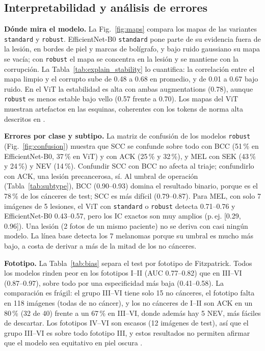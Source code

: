 \documentclass[conference]{IEEEtran}
\begin{document}
\subsection{Interpretabilidad y análisis de errores}
\textbf{Dónde mira el modelo.} La Fig.~\ref{fig:maps} compara los mapas de las variantes \texttt{standard} y \texttt{robust}. EfficientNet-B0 \texttt{standard} pone parte de su evidencia fuera de la lesión, en bordes de piel y marcas de bolígrafo, y bajo ruido gaussiano su mapa se vacía; con \texttt{robust} el mapa se concentra en la lesión y se mantiene con la corrupción. La Tabla~\ref{tab:explain_stability} lo cuantifica: la correlación entre el mapa limpio y el corrupto sube de 0.48 a 0.68 en promedio, y de 0.01 a 0.67 bajo ruido. En el ViT la estabilidad es alta con ambas augmentations (0.78), aunque \texttt{robust} es menos estable bajo vello (0.57 frente a 0.70). Los mapas del ViT muestran artefactos en las esquinas, coherentes con los tokens de norma alta descritos en \cite{darcet2024}.

\textbf{Errores por clase y subtipo.} La matriz de confusión de los modelos \texttt{robust} (Fig.~\ref{fig:confusion}) muestra que SCC se confunde sobre todo con BCC (51\,\% en EfficientNet-B0, 37\,\% en ViT) y con ACK (25\,\% y 32\,\%), y MEL con SEK (43\,\% y 24\,\%) y NEV (14\,\%). Confundir SCC con BCC no afecta al triaje; confundirlo con ACK, una lesión precancerosa, sí. Al umbral de operación (Tabla~\ref{tab:subtype}), BCC (0.90--0.93) domina el resultado binario, porque es el 78\,\% de los cánceres de test; SCC es más difícil (0.79--0.87). Para MEL, con solo 7 imágenes de 5 lesiones, el ViT con \texttt{standard} o \texttt{robust} detecta 0.71--0.76 y EfficientNet-B0 0.43--0.57, pero los IC exactos son muy amplios (p.\,ej. [0.29, 0.96]). Una lesión (2 fotos de un mismo paciente) no se deriva con casi ningún modelo. La línea base detecta los 7 melanomas porque su umbral es mucho más bajo, a costa de derivar a más de la mitad de los no cánceres.

\textbf{Fototipo.} La Tabla~\ref{tab:bias} separa el test por fototipo de Fitzpatrick. Todos los modelos rinden peor en los fototipos I--II (AUC 0.77--0.82) que en III--VI (0.87--0.97), sobre todo por una especificidad más baja (0.41--0.58). La comparación es frágil: el grupo III--VI tiene solo 15 no cánceres, el fototipo falta en 118 imágenes (todas de no cáncer), y los no cánceres de I--II son ACK en un 80\,\% (32 de 40) frente a un 67\,\% en III--VI, donde además hay 5 NEV, más fáciles de descartar. Los fototipos IV--VI son escasos (12 imágenes de test), así que el grupo III--VI es sobre todo fototipo III, y estos resultados no permiten afirmar que el modelo sea equitativo en piel oscura \cite{daneshjou2022}.
\end{document}
